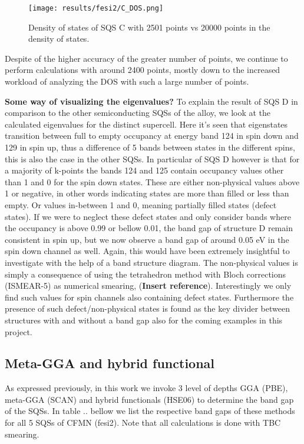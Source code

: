\begin{figure}[H]
	\texttt{[image: results/fesi2/C\_DOS.png]}
	\caption{Density of states of SQS C with 2501 points vs 20000 points in the density of states.}
\end{figure} 

Despite of the higher accuracy of the greater number of points, we continue to perform calculations with around 2400 points, mostly down to the increased workload of analyzing the DOS with such a large number of points. 
 
\textbf{Some way of visualizing the eigenvalues?}
To explain the result of SQS D in comparison to the other semiconducting SQSs of the alloy, we look at the calculated eigenvalues for the distinct supercell. Here it's seen that eigenstates transition between full to empty occupancy at energy band 124 in spin down and 129 in spin up, thus a difference of 5 bands between states in the different spins, this is also the case in the other SQSs. In particular of SQS D however is that for a majority of k-points the bands 124 and 125 contain occupancy values other than 1 and 0 for the spin down states. These are either non-physical values above 1 or negative, in other words indicating states are more than filled or less than empty. Or values in-between 1 and 0, meaning partially filled states (defect states). If we were to neglect these defect states and only consider bands where the occupancy is above 0.99 or bellow 0.01, the band gap of structure D remain consistent in spin up, but we now observe a band gap of around 0.05 eV in the spin down channel as well. Again, this would have been extremely insightful to investigate with the help of a band structure diagram. The non-physical values is simply a consequence of using the tetrahedron method with Bloch corrections (ISMEAR-5) as numerical smearing, (\textbf{Insert reference}). Interestingly we only find such values for spin channels also containing defect states. Furthermore the presence of such defect/non-physical states is found as the key divider between structures with and without a band gap also for the coming examples in this project. 

\subsection{Meta-GGA and hybrid functional}

As expressed previously, in this work we invoke 3 level of depths GGA (PBE), meta-GGA (SCAN) and hybrid functionals (HSE06) to determine the band gap of the SQSs. In table .. bellow we list the respective band gaps of these methods for all 5 SQSs of CFMN (fesi2). Note that all calculations is done with TBC smearing.

